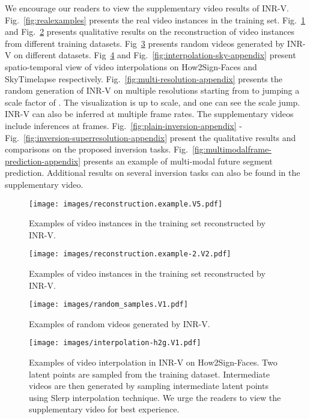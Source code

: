 \documentclass[10pt]{article} \usepackage[accepted]{tmlr}
\begin{document}
We encourage our readers to view the supplementary video results of INR-V. Fig.~\ref{fig:realexamples} presents the real video instances in the training set. Fig.~\ref{fig:rec-1-appendix} and Fig.~\ref{fig:rec-2-appendix} presents qualitative results on the reconstruction of video instances from different training datasets. Fig~\ref{fig:random-samples-appendix} presents random videos generated by INR-V on different datasets. Fig~\ref{fig:interpolation-h2g-appendix} and Fig.~\ref{fig:interpolation-sky-appendix} present spatio-temporal view of video interpolations on How2Sign-Faces and SkyTimelapse respectively. Fig.~\ref{fig:multi-resolution-appendix} presents the random generation of INR-V on multiple resolutions starting from  to  jumping a scale factor of . The visualization is up to scale, and one can see the scale jump. INR-V can also be inferred at multiple frame rates. The supplementary videos include inferences at  frames. Fig.~\ref{fig:plain-inversion-appendix} - Fig.~\ref{fig:inversion-superresolution-appendix} present the qualitative results and comparisons on the proposed inversion tasks. Fig.~\ref{fig:multimodalframe-prediction-appendix} presents an example of multi-modal future segment prediction. Additional results on several inversion tasks can also be found in the supplementary video.

\begin{figure}[t]
  \centering
  \texttt{[image: images/reconstruction.example.V5.pdf]}
  \caption{Examples of video instances in the training set reconstructed by INR-V.}
  \label{fig:rec-1-appendix}
\end{figure}

\begin{figure}[t]
  \centering
  \texttt{[image: images/reconstruction.example-2.V2.pdf]}
  \caption{Examples of video instances in the training set reconstructed by INR-V.}
  \label{fig:rec-2-appendix}
\end{figure}

\begin{figure}[t]
  \centering
  \texttt{[image: images/random\_samples.V1.pdf]}
  \caption{Examples of random videos generated by INR-V.}
  \label{fig:random-samples-appendix}
\end{figure}

\begin{figure}[t]
  \centering
  \texttt{[image: images/interpolation-h2g.V1.pdf]}
  \caption{Examples of video interpolation in INR-V on How2Sign-Faces. Two latent points are sampled from the training dataset. Intermediate videos are then generated by sampling intermediate latent points using Slerp interpolation technique. We urge the readers to view the supplementary video for best experience. }
  \label{fig:interpolation-h2g-appendix}
\end{figure}
\end{document}
